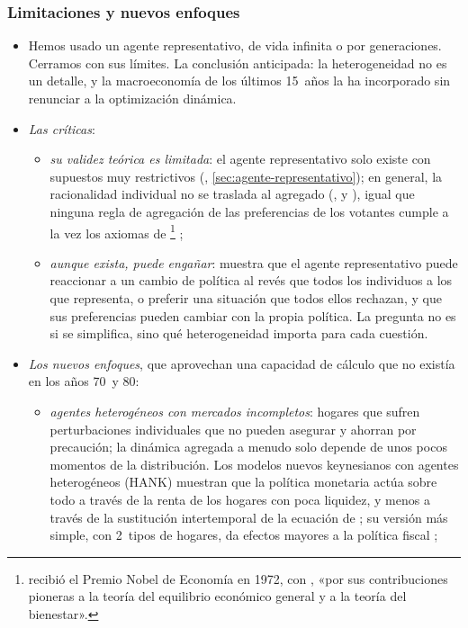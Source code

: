 \documentclass[11pt]{article}
\begin{document}
\subsubsection{Limitaciones y nuevos enfoques}\label{sec:limitaciones}

\begin{itemize}
\item Hemos usado un agente representativo, de vida infinita o por generaciones. Cerramos con sus límites. La conclusión anticipada: la heterogeneidad no es un detalle, y la macroeconomía de los últimos 15~años la ha incorporado sin renunciar a la optimización dinámica.
\item \emph{Las críticas}:
  \begin{itemize}
  \item \emph{su validez teórica es limitada}: el agente representativo solo existe con supuestos muy restrictivos (, \ref{sec:agente-representativo}); en general, la racionalidad individual no se traslada al agregado (,  y ), igual que ninguna regla de agregación de las preferencias de los votantes cumple a la vez los axiomas de \footnote{ recibió el Premio Nobel de Economía en 1972, con , «por sus contribuciones pioneras a la teoría del equilibrio económico general y a la teoría del bienestar»\nocite{Nobel1972HicksArrow}.} ;
  \item \emph{aunque exista, puede engañar}: \textcite{Kirman1992Whom} muestra que el agente representativo puede reaccionar a un cambio de política al revés que todos los individuos a los que representa, o preferir una situación que todos ellos rechazan, y que sus preferencias pueden cambiar con la propia política. La pregunta no es si se simplifica, sino qué heterogeneidad importa para cada cuestión.
  \end{itemize}
\item \emph{Los nuevos enfoques}, que aprovechan una capacidad de cálculo que no existía en los años 70~y 80:
  \begin{itemize}
  \item \emph{agentes heterogéneos con mercados incompletos}: hogares que sufren perturbaciones individuales que no pueden asegurar y ahorran por precaución\nocite{Aiyagari1994Uninsured}; la dinámica agregada a menudo solo depende de unos pocos momentos de la distribución\nocite{KrusellSmith1998Income}. Los modelos nuevos keynesianos con agentes heterogéneos (HANK) muestran que la política monetaria actúa sobre todo a través de la renta de los hogares con poca liquidez, y menos a través de la sustitución intertemporal de la ecuación de \nocite{KaplanMollViolante2018Monetary}; su versión más simple, con 2~tipos de hogares, da efectos mayores a la política fiscal\nocite{GaliLopezSalidoValles2007} ;

\end{itemize}
\end{itemize}
\end{document}
